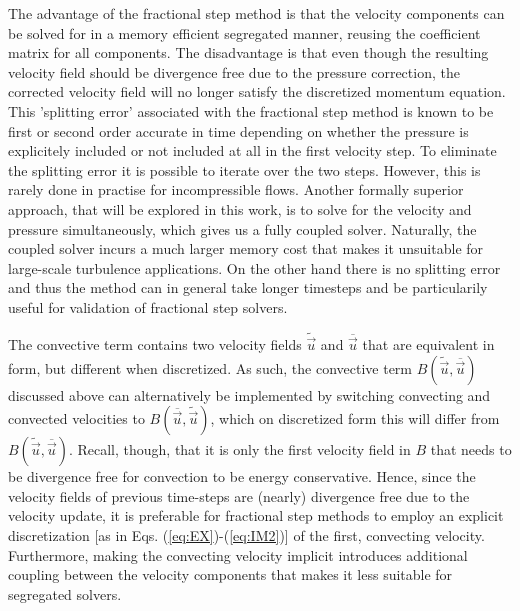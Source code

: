 The advantage of the fractional step method is that the velocity components can be solved for in a memory efficient segregated manner, reusing the coefficient matrix for all components. The disadvantage is that even though the resulting velocity field should be divergence free due to the pressure correction, the corrected velocity field will no longer satisfy the discretized momentum equation. This 'splitting error' associated with the fractional step method is known to be first or second order accurate in time depending on whether the pressure is explicitely included or not included at all in the first velocity step. To eliminate the splitting error it is possible to iterate over the two steps. However, this is rarely done in practise for incompressible flows. Another formally superior approach, that will be explored in this work, is to solve for the velocity and pressure simultaneously, which gives us a fully coupled solver. Naturally, the coupled solver incurs a much larger memory cost that makes it unsuitable for large-scale turbulence applications. On the other hand there is no splitting error and thus the method can in general take longer timesteps and be particularily useful for validation of fractional step solvers.

The convective term contains two velocity fields $\tilde{\vec{u}}$ and $\overline{\vec{u}}$ that are equivalent in form, but different when discretized. As such, the convective term $B(\tilde{\vec{u}},\overline{\vec{u}})$ discussed above can alternatively be implemented by switching convecting and convected velocities to  $B(\overline{\vec{u}},\tilde{\vec{u}})$, which on discretized form this will differ from $B(\tilde{\vec{u}},\overline{\vec{u}})$. Recall, though, that it is only the first velocity field in $B$ that needs to be divergence free for convection to be energy conservative. Hence, since the velocity fields of previous time-steps are (nearly) divergence free due to the velocity update,  it is preferable for fractional step methods to employ an explicit discretization [as in Eqs. (\ref{eq:EX})-(\ref{eq:IM2})] of the first, convecting velocity. Furthermore, making the convecting velocity implicit introduces additional coupling between the velocity components that makes it less suitable for segregated solvers.

